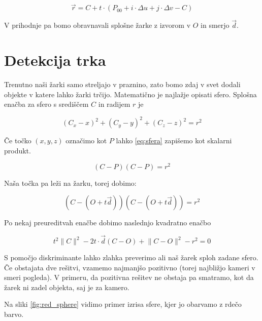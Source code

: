 \documentclass[12pt, a4paper]{article}
\begin{document}
\begin{equation}
	\vec{r} = C + t \cdot (P_{00} + i \cdot \Delta u + j \cdot \Delta v - C)
\end{equation}

V prihodnje pa bomo obravnavali splošne žarke z izvorom v $O$ in smerjo $\vec{d}$.

\section{Detekcija trka}

Trenutno naši žarki samo streljajo v praznino, zato bomo zdaj v svet dodali objekte v katere lahko žarki trčijo.
Matematično je najlažje opisati sfero. Splošna enačba za sfero s središčem $C$ in radijem $r$ je

\begin{equation}
	\label{eq:sfera}
	(C_{x} - x)^2  + (C_{y} - y)^2  + (C_{z} - z)^2  = r^2
\end{equation}

Če točko $(x,y,z)$ označimo kot $P$ lahko \ref{eq:sfera} zapišemo kot skalarni produkt.

\begin{equation}
	(C - P)(C - P) = r^2
\end{equation}

Naša točka pa leži na žarku, torej dobimo:

\begin{equation}
	(C - (O + t \vec{d}))(C - (O + t \vec{d})) = r^2
\end{equation}

Po nekaj preureditvah enačbe dobimo naslednjo kvadratno enačbo

\begin{equation}
	t^2 \lVert C \rVert ^2  - 2 t \cdot \vec{d} (C - O) + \lVert C - O \rVert ^2  - r^2 = 0
\end{equation}

S pomočjo diskriminante lahko zlahka preverimo ali naš žarek sploh zadane sfero. Če obstajata dve rešitvi, vzamemo
najmanjšo pozitivno (torej najbližjo kameri v smeri pogleda). V primeru, da pozitivna rešitev ne obstaja pa
smatramo, kot da žarek ni zadel objekta, saj je za kamero.

Na sliki \ref{fig:red_sphere} vidimo primer izrisa sfere, kjer jo obarvamo z rdečo barvo.
\end{document}
